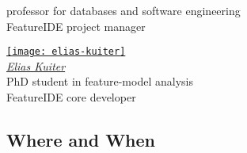 \begin{frame}{\myframetitle}
\begin{mycolumns}
{{{					\small professor for databases and software engineering\\[.5ex]
					FeatureIDE project manager
				}
				\parbox{0.45\linewidth}{
					\centering
					\href{https://www.dbse.ovgu.de/Mitarbeiter/Elias+Kuiter.html}{\texttt{[image: elias-kuiter]}}\\[.5ex]
					\href{https://www.dbse.ovgu.de/Mitarbeiter/Elias+Kuiter.html}{\emph{Elias Kuiter}}\\[.5ex]
					\small PhD student in feature-model analysis\\[.5ex]
					FeatureIDE core developer
				}
			}
		}
	\end{mycolumns}
\end{frame}

\subsection{Where and When}

